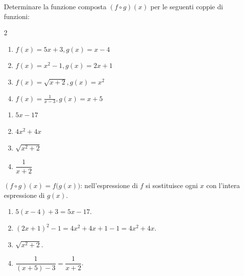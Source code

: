 \begin{question}[ID=5.3, subtitle={Funzione composta $(f\circ g)(x)$ — serie 3}, difficulty=media, tags={funzioni,composte}]
Determinare la funzione composta \( (f\circ g)(x) \) per le seguenti coppie di funzioni:

\begin{center}\begin{minipage}{0.92\linewidth}
\begin{multicols}{2}
\begin{enumerate}[leftmargin=3.2cm]
\item $f(x)=5x+3, g(x)=x-4$
\item $f(x)=x^2-1, g(x)=2x+1$
\item $f(x)=\sqrt{x+2}, g(x)=x^2$
\item $f(x)=\frac{1}{x-3}, g(x)=x+5$
\end{enumerate}
\end{multicols}
\end{minipage}\end{center}
\begin{solution}
\begin{enumerate}
    \item $5x-17$
    \item $4x^2+4x$
    \item $\sqrt{x^2+2}$
    \item $\dfrac{1}{x+2}$
\end{enumerate}
\end{solution}
\begin{explanation}
$(f\circ g)(x)=f\big(g(x)\big)$: nell'espressione di $f$ si sostituisce ogni $x$ con l'intera espressione di $g(x)$.
\begin{enumerate}
    \item $5(x-4)+3=5x-17$.
    \item $(2x+1)^2-1=4x^2+4x+1-1=4x^2+4x$.
    \item $\sqrt{x^2+2}$.
    \item $\dfrac{1}{(x+5)-3}=\dfrac{1}{x+2}$.
\end{enumerate}
\end{explanation}
\end{question}


